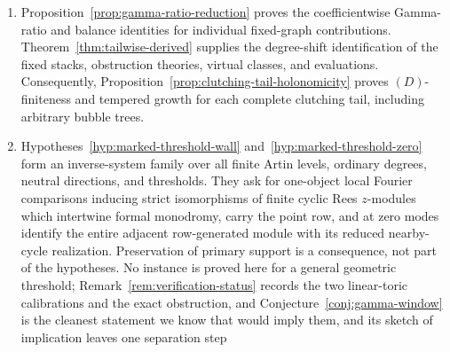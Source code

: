 \begin{enumerate}[label=\textup{(\arabic*)}]
  The wall contributions vanish because the distinguished class is inserted at
  the output evaluation of the graph factor, which is computed from the
  principal component and therefore lands in a fixed locus semistable for the
  interpolated polarization, on which this particular class restricts to zero.
  No claim is made that arbitrary insertions enjoy the same collapse; an
  ordinary marking carried off on a bubble tree is not covered, and
  Remark~\ref{rem:iv-semistable-restriction} explains why no choice of class
  would repair that.  Two further inputs of that proof are used and not proved
  here.  The virtual Kalkman identity for the polarization sweep is applied
  with the endpoint normalization recalled in the proof, under
  Definition~\ref{def:gauged-admissible}\textup{(ii)}; the master-space normal
  complex is not exhibited.  And
  Lemma~\ref{lem:point-insertion-row} takes from Woodward's graph-space
  normalization that \(D\tau_{Y,-}\) is the genus-zero fundamental solution of
  the quantum connection and is unitary for the twisted pairing; a different
  normalization would change only the invertible scalar it produces.
\item Proposition~\ref{prop:gamma-ratio-reduction} proves the
  coefficientwise Gamma-ratio and balance identities for individual
  fixed-graph contributions.  Theorem~\ref{thm:tailwise-derived} supplies
  the degree-shift identification of the fixed stacks, obstruction theories,
  virtual classes, and evaluations.  Consequently,
  Proposition~\ref{prop:clutching-tail-holonomicity} proves \((D)\)-finiteness and
  tempered growth for each complete clutching tail, including arbitrary
  bubble trees.
\item Hypotheses~\ref{hyp:marked-threshold-wall}
  and~\ref{hyp:marked-threshold-zero} form an inverse-system family over
  all finite Artin levels, ordinary degrees, neutral directions, and
  thresholds.  They ask for one-object local Fourier comparisons inducing
  strict isomorphisms of finite cyclic Rees
  \(z\)-modules which intertwine formal monodromy, carry the point row, and at
  zero modes identify the entire adjacent row-generated module with its
  reduced nearby-cycle realization.  Preservation of primary support is a
  consequence, not part of the hypotheses.  No
  instance is proved here for a general geometric threshold;
  Remark~\ref{rem:verification-status} records the two linear-toric
  calibrations and the exact obstruction, and
  Conjecture~\ref{conj:gamma-window} is the cleanest statement we know that
  would imply them, and its sketch of implication leaves one separation step

\end{enumerate}
